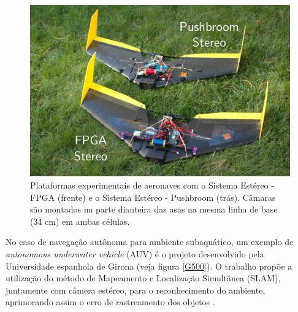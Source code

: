 \begin{figure}[H]
 	\centering
 	\includegraphics[scale=0.30]{./Resources/mit_drones.png}
 	\caption{Plataformas experimentais de aeronaves com o Sistema Estéreo - FPGA (frente) e o Sistema Estéreo - Pushbroom (trás). Câmaras são montados na parte dianteira das asas na mesma linha de base (34 cm) em ambas células.}
 	\label{mit_drones}
\end{figure}

No caso de navegação autônoma para ambiente subaquático, um exemplo de \textit{autonomous underwater vehicle} (AUV) é o projeto desenvolvido pela Universidade espanhola de Girona (veja figura \ref{G500}). O trabalho propõe a utilização do método de Mapeamento e Localização Simultânea (SLAM), juntamente com câmera estéreo, para o reconhecimento do ambiente, aprimorando assim o erro de rastreamento dos objetos \cite{Nagappa2013}.

